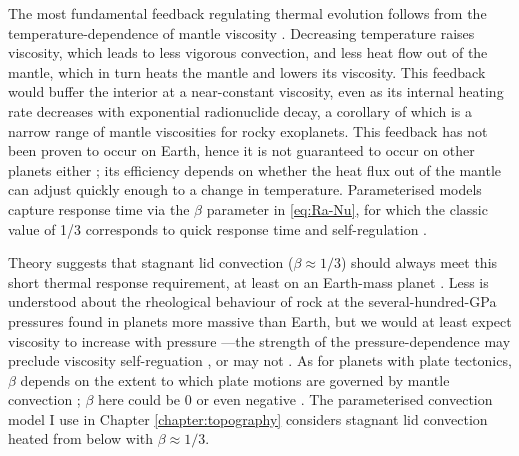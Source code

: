 The most fundamental feedback regulating thermal evolution follows from the temperature-dependence of mantle viscosity \citep{tozer_present_1972}. Decreasing temperature raises viscosity, which leads to less vigorous convection, and less heat flow out of the mantle, which in turn heats the mantle and lowers its viscosity. This feedback would buffer the interior at a near-constant viscosity, even as its internal heating rate decreases with exponential radionuclide decay, a corollary of which is a narrow range of mantle viscosities for rocky exoplanets. This \citeauthor{tozer_present_1972} feedback has not been proven to occur on Earth, hence it is not guaranteed to occur on other planets either \citep{korenaga_can_2016}; its efficiency depends on whether the heat flux out of the mantle can adjust quickly enough to a change in temperature. Parameterised models capture response time via the $\beta$ parameter in \eqref{eq:Ra-Nu}, for which the classic value of 1/3 corresponds to quick response time and self-regulation \citep{seales_assessing_2019}.

Theory suggests that stagnant lid convection ($\beta \approx 1/3$) should always meet this short thermal response requirement, at least on an Earth-mass planet \citep{korenaga_can_2016}. Less is understood about the rheological behaviour of rock at the several-hundred-GPa pressures found in planets more massive than Earth, but we would at least expect viscosity to increase with pressure \citep{christensen_convection_1984}---the strength of the pressure-dependence may preclude viscosity self-reguation \citep{stamenkovic_influence_2012}, or may not \citep{tackley_mantle_2013}. As for planets with plate tectonics, $\beta$ depends on the extent to which plate motions are governed by mantle convection \citep[as opposed to, e.g., the plates' own strength;][]{conrad_effects_1999, crowley_analytic_2012}; $\beta$ here could be 0 or even negative \citep{korenaga_energetics_2003}. The parameterised convection model I use in Chapter \ref{chapter:topography} considers stagnant lid convection heated from below with $\beta \approx 1/3$.






